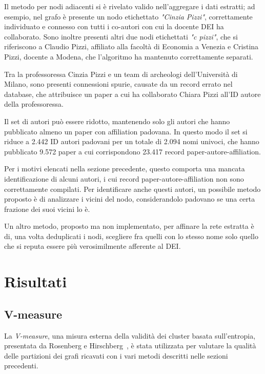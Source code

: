 \documentclass[12pt,a4paper,twoside]{report}
\begin{document}
Il metodo per nodi adiacenti si è rivelato valido nell'aggregare i dati estratti; ad esempio, nel
grafo è presente un nodo etichettato \textit{"Cinzia Pizzi"}, correttamente individuato e connesso
con tutti i co-autori con cui la docente DEI ha collaborato. Sono inoltre presenti
altri due nodi etichettati \textit{"c pizzi"}, che si riferiscono a Claudio Pizzi, affiliato alla
facoltà di Economia a Venezia e Cristina Pizzi, docente a Modena, che l'algoritmo ha mantenuto
correttamente separati.

Tra la professoressa Cinzia Pizzi e un team di archeologi dell'Università di Milano, sono presenti
connessioni spurie, causate da un record errato nel database, che attribuisce un paper a cui ha
collaborato Chiara Pizzi all'ID autore della professoressa.

Il set di autori può essere ridotto, mantenendo solo gli autori che hanno pubblicato almeno un paper
con affiliation padovana. In questo modo il set si riduce a 2.442 ID autori padovani per un totale
di 2.094 nomi univoci, che hanno pubblicato 9.572 paper a cui corrispondono 23.417 record
paper-autore-affiliation.

Per i motivi elencati nella sezione precedente, questo comporta una mancata identificazione di
alcuni autori, i cui record paper-autore-affiliation non sono correttamente compilati. Per
identificare anche questi autori, un possibile metodo proposto è di analizzare i vicini del nodo,
considerandolo padovano se una certa frazione dei suoi vicini lo è.

Un altro metodo, proposto ma non implementato, per affinare la rete estratta è di, una volta
deduplicati i nodi, scegliere fra quelli con lo stesso nome solo quello che si reputa essere più
verosimilmente afferente al DEI.


\whitePage
\chapter{Risultati} \label{cap:risultati}

\section{V-measure} \label{sec:vmeasure}

La \textit{V-measure}, una misura esterna della validità
dei cluster basata sull'entropia, presentata da Rosenberg e Hirschberg~\cite{vmeasure}, è stata
utilizzata per valutare la qualità delle partizioni dei grafi ricavati con i vari metodi descritti
nelle sezioni precedenti.
\end{document}
